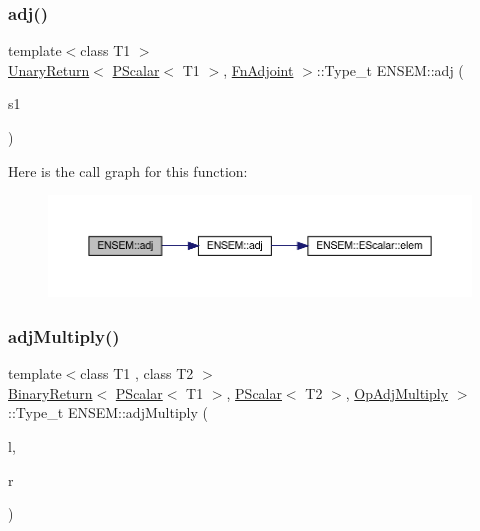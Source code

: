 \subsubsection{\texorpdfstring{adj()}{adj()}}
{\footnotesize\ttfamily template$<$class T1 $>$ \\
\mbox{\hyperlink{structENSEM_1_1UnaryReturn}{Unary\+Return}}$<$ \mbox{\hyperlink{classENSEM_1_1PScalar}{P\+Scalar}}$<$ T1 $>$, \mbox{\hyperlink{structENSEM_1_1FnAdjoint}{Fn\+Adjoint}} $>$\+::Type\+\_\+t E\+N\+S\+E\+M\+::adj (\begin{DoxyParamCaption}\item[{const \mbox{\hyperlink{classENSEM_1_1PScalar}{P\+Scalar}}$<$ T1 $>$ \&}]{s1 }\end{DoxyParamCaption})\hspace{0.3cm}{\ttfamily [inline]}}

Here is the call graph for this function\+:\nopagebreak
\begin{figure}[H]
\begin{center}
\leavevmode
\includegraphics[width=350pt]{db/dcc/group__primscalar_ga7014b73d255c4b57001dd68abf3a51c3_cgraph}
\end{center}
\end{figure}
\mbox{\label{group__primscalar_gacd01dab554ff851aa1ca0012ec9accf0}} 
\subsubsection{\texorpdfstring{adjMultiply()}{adjMultiply()}}
{\footnotesize\ttfamily template$<$class T1 , class T2 $>$ \\
\mbox{\hyperlink{structENSEM_1_1BinaryReturn}{Binary\+Return}}$<$ \mbox{\hyperlink{classENSEM_1_1PScalar}{P\+Scalar}}$<$ T1 $>$, \mbox{\hyperlink{classENSEM_1_1PScalar}{P\+Scalar}}$<$ T2 $>$, \mbox{\hyperlink{structENSEM_1_1OpAdjMultiply}{Op\+Adj\+Multiply}} $>$\+::Type\+\_\+t E\+N\+S\+E\+M\+::adj\+Multiply (\begin{DoxyParamCaption}\item[{const \mbox{\hyperlink{classENSEM_1_1PScalar}{P\+Scalar}}$<$ T1 $>$ \&}]{l,  }\item[{const \mbox{\hyperlink{classENSEM_1_1PScalar}{P\+Scalar}}$<$ T2 $>$ \&}]{r }\end{DoxyParamCaption})\hspace{0.3cm}{\ttfamily [inline]}}

